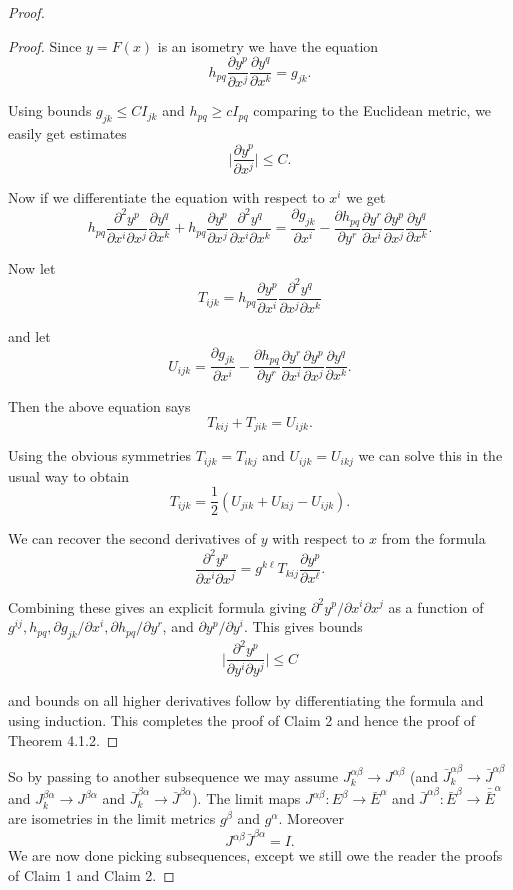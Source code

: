 \begin{proof}
\begin{proof}
Since $y=F(x)$ is an isometry we have the equation
$$
h_{pq} \frac{\partial y^p}{\partial x^j} \frac{\partial
y^q}{\partial x^k} = g_{jk}.
$$

\noindent Using bounds $g_{jk} \leq CI_{jk}$ and $h_{pq} \geq
cI_{pq}$ comparing to the Euclidean metric, we easily get
estimates
$$
\Big| \frac{\partial y^p}{\partial x^j} \Big| \leq C.
$$

\noindent Now if we differentiate the equation with respect to
$x^i$ we get
$$
h_{pq} \frac{\partial^2y^p}{\partial x^i \partial x^j}
\frac{\partial y^q}{\partial x^k} + h_{pq} \frac{\partial
y^p}{\partial x^j} \frac{\partial^2y^q}{\partial x^i \partial x^k}
= \frac{\partial g_{jk}}{\partial x^i} - \frac{\partial
h_{pq}}{\partial y^r} \frac{\partial y^r}{\partial x^i}
\frac{\partial y^p}{\partial x^j} \frac{\partial y^q}{\partial
x^k}.
$$

\noindent Now let
$$
T_{ijk} = h_{pq} \frac{\partial y^p}{\partial x^i}
\frac{\partial^2 y^q}{\partial x^j \partial x^k}
$$

\noindent and let
$$
U_{ijk} = \frac{\partial g_{jk}}{\partial x^i} - \frac{\partial
h_{pq}}{\partial y^r} \frac{\partial y^r}{\partial x^i}
\frac{\partial y^p}{\partial x^j} \frac{\partial y^q}{\partial
x^k}.
$$

\noindent Then the above equation says
$$
T_{kij}+T_{jik}=U_{ijk}.
$$

\noindent Using the obvious symmetries $T_{ijk}=T_{ikj}$ and
$U_{ijk} = U_{ikj}$ we can solve this in the usual way to obtain
$$
T_{ijk} = \frac{1}{2}(U_{jik}+U_{kij} - U_{ijk}).
$$

\noindent We can recover the second derivatives of $y$ with
respect to $x$ from the formula
$$
\frac{\partial^2 y^p}{\partial x^i \partial x^j} = g^{k
\ell}T_{kij} \frac{\partial y^p}{\partial x^\ell}.
$$

\noindent Combining these gives an explicit formula giving
$\partial^2y^p/\partial x^i \partial x^j$ as a function of
$g^{ij}, h_{pq}, \partial g_{jk}/\partial x^i, \partial
h_{pq}/\partial y^r$, and $ \partial y^p/\partial y^i$. This gives
bounds
$$
\Big| \frac{\partial^2 y^p}{\partial y^i \partial y^j}\Big| \leq C
$$

\noindent and bounds on all higher derivatives follow by
differentiating the formula and using induction. This completes
the proof of Claim 2 and hence the proof of Theorem 4.1.2.
\end{proof}

So by passing to another subsequence we may assume
$J_k^{\alpha\beta}\to J^{\alpha\beta}$ (and $\bar
J_k^{\alpha\beta}\to \bar J^{\alpha\beta}$ and
$J_k^{\beta\alpha}\to J^{\beta\alpha}$ and $\bar
J_k^{\beta\alpha}\to \bar J^{\beta\alpha}$). The limit maps
$J^{\alpha\beta}: E^{\beta}\to \bar E^{\alpha}$ and $\bar
J^{\alpha\beta}: \bar E^{\beta}\to {\bar{\bar E}}^{\alpha}$ are
isometries in the limit metrics $g^{\beta}$ and $g^{\alpha}$.
Moreover
$$
J^{\alpha\beta}\bar J^{\beta\alpha}=I.
$$
We are now done picking subsequences, except we still owe the
reader the proofs of Claim 1 and Claim 2.


\end{proof}

